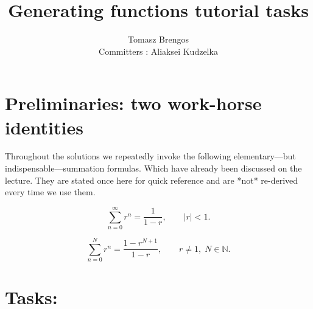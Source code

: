 \documentclass[docmute]{article}
\title{Generating functions tutorial tasks}
\author{Tomasz Brengos \\  
Committers : Aliaksei Kudzelka}
\date{}
\begin{document}

\section*{Preliminaries: two work-horse identities}

Throughout the solutions we repeatedly invoke the following elementary—but
indispensable—summation formulas. Which have already been discussed on the lecture.
They are stated once here for quick reference and are *not* re-derived every time
we use them.

\begin{description}[leftmargin=1.4cm,labelsep=0.5cm]
  \item[Infinite geometric series] 
  \begin{equation}\label{eq:geom-inf}
       \sum_{n=0}^{\infty} r^{n}= \frac{1}{1-r},
       \qquad |r|<1.
  \end{equation}

  \item[Finite geometric series] 
  \begin{equation}\label{eq:geom-fin}
       \sum_{n=0}^{N} r^{n}= \frac{1-r^{N+1}}{1-r},
       \qquad r\neq 1,\; N\in\mathbb N.
  \end{equation}
\end{description}


\section*{Tasks:}
\end{document}
